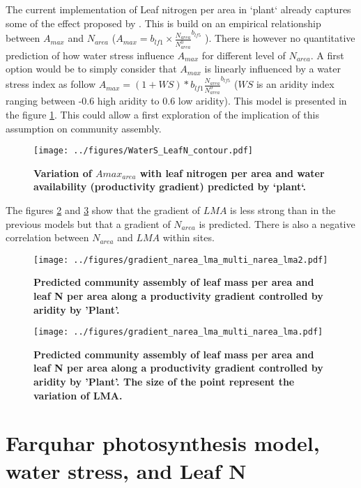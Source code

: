 \documentclass[a4paper,11pt]{article}
\begin{document}
 The current implementation of Leaf nitrogen per area in `plant` already captures some of the effect proposed by \citet{Wright-2003}. This is build on an empirical relationship between $A_{max}$ and $N_{area}$
($A_{max} = b_{lf1} \times \frac{N_{area}}{N^0_{area}}^{b_{lf5}}$ \citep{Falster-2016}). There is however no quantitative prediction of how water stress influence $A_{max}$ for different level of $N_{area}$. A first option would be to simply consider that $A_{max}$ is linearly influenced by a water stress index  as follow $A_{max} = (1+WS) * b_{lf1} \frac{N_{area}}{N^0_{area}}^{b_{lf5}}$ ($WS$ is an aridity index ranging between -0.6 high aridity to 0.6 low aridity). This model is presented in the figure \ref{fig:leafN_water}. This could allow a first exploration of the implication of this assumption on community assembly.


\begin{figure}[ht]
\centering
\texttt{[image: ../figures/WaterS\_LeafN\_contour.pdf]}
\caption{\textbf{Variation of $A{max}_{area}$ with leaf nitrogen per area and water availability (productivity gradient) predicted by `plant`.}
\label{fig:leafN_water}}
\end{figure}

The figures \ref{fig:lma_narea1} and \ref{fig:lma_narea2} show that
the gradient of $LMA$ is less strong than in the previous models but that a gradient of $N_{area}$ is predicted. There is also a negative correlation between $N_{area}$ and $LMA$ within sites.

\begin{figure}[ht]
\centering
\texttt{[image: ../figures/gradient\_narea\_lma\_multi\_narea\_lma2.pdf]}
\caption{\textbf{Predicted community assembly of leaf mass per area and leaf N per area along a productivity gradient controlled by aridity by 'Plant'.}
\label{fig:lma_narea1}}
\end{figure}

\begin{figure}[ht]
\centering
\texttt{[image: ../figures/gradient\_narea\_lma\_multi\_narea\_lma.pdf]}
\caption{\textbf{Predicted community assembly of leaf mass per area and leaf N per area along a productivity gradient controlled by aridity by 'Plant'. The size of the point represent the variation of LMA.}
\label{fig:lma_narea2}}
\end{figure}

\clearpage

\section{Farquhar photosynthesis model, water stress, and Leaf N}
\end{document}
